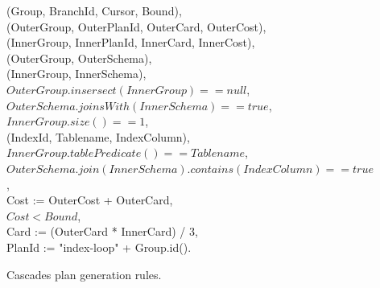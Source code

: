 \begin{figure}
\begin{boxedminipage}{\linewidth}
(Group, BranchId, Cursor, Bound), \\
(OuterGroup, OuterPlanId, OuterCard, OuterCost), \\
(InnerGroup, InnerPlanId, InnerCard, InnerCost), \\
(OuterGroup, OuterSchema), \\
(InnerGroup, InnerSchema), \\
\datalogspace $OuterGroup.insersect(InnerGroup) ==  null$, \\
\datalogspace $OuterSchema.joinsWith(InnerSchema) ==  true$, \\
\datalogspace $InnerGroup.size() == 1$, \\
(IndexId, Tablename, IndexColumn), \\
\datalogspace $InnerGroup.tablePredicate() == Tablename$, \\
\datalogspace $OuterSchema.join(InnerSchema).contains(IndexColumn) ==  true$, \\
\datalogspace Cost := OuterCost + OuterCard, \\
\datalogspace $Cost < Bound$, \\
\datalogspace Card := (OuterCard * InnerCard) / 3, \\ 
\datalogspace PlanId := "index-loop" + Group.id(). \\
  
\end{boxedminipage}
\caption{\label{ch:evita:fig:cascades_plan} Cascades plan generation rules.}
\end{figure}

